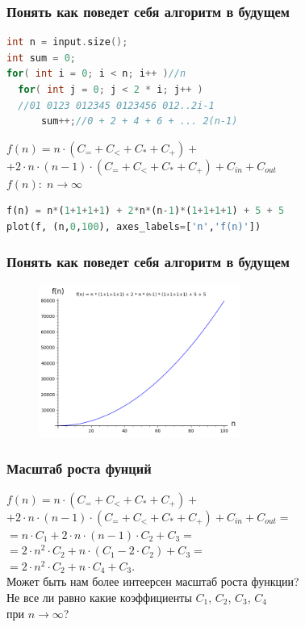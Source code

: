 \documentclass[russian, 12pt]{beamer}
\begin{document}
\begin{frame}[fragile]
\frametitle{Понять как поведет себя алгоритм в будущем}
\begin{lstlisting}[language=C++]
int n = input.size();
int sum = 0;
for( int i = 0; i < n; i++ )//n
  for( int j = 0; j < 2 * i; j++ )
  //01 0123 012345 0123456 012..2i-1
      sum++;//0 + 2 + 4 + 6 + ... 2(n-1)  
\end{lstlisting}
$f(n) = n \cdot (C_= + C_< + C_* + C_+) +$\\
$ + 2\cdot n\cdot (n-1) \cdot (C_= + C_< + C_* + C_+) + C_{in} + C_{out}$\\[0.2cm]
\pause
$f(n) :\; n \rightarrow \infty$
\pause
\begin{lstlisting}[language=python]
f(n) = n*(1+1+1+1) + 2*n*(n-1)*(1+1+1+1) + 5 + 5
plot(f, (n,0,100), axes_labels=['n','f(n)']) 
\end{lstlisting}
\end{frame}
\begin{frame}[fragile]
\frametitle{Понять как поведет себя алгоритм в будущем}
\begin{figure}
  \includegraphics[width=0.8\linewidth, height=5cm]{img/complexity_1.png}
\end{figure}
\end{frame}
\begin{frame}
\frametitle{Масштаб роста фунций}
$f(n) = n \cdot (C_= + C_< + C_* + C_+) +$\\
$ + 2\cdot n\cdot (n-1) \cdot (C_= + C_< + C_* + C_+) + C_{in} + C_{out}=$\\
\pause
$= n \cdot C_1 + 2\cdot n\cdot (n-1) \cdot C_2 + C_3=$\\
\pause
$= 2\cdot n^2 \cdot C_2 + n \cdot(C_1 -2\cdot C_2) + C_3=$\\[0.2cm]
\pause
$= 2\cdot n^2 \cdot C_2 + n \cdot C_4 + C_3.$\\[0.2cm]
\pause
Может быть нам более интеерсен масштаб роста функции?\\[0.2cm]
\pause
Не все ли равно какие коэффициенты $C_1$, $C_2$, $C_3$, $C_4$\\ 
при $n\rightarrow\infty$? 
\end{frame}
\end{document}
